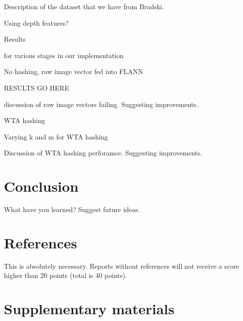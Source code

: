 \documentclass[10pt,twocolumn,letterpaper]{article}
\begin{document}
Description of the dataset that we have from Bradski. 

Using depth features?

Results

for various stages in our implementation

No hashing, raw image vector fed into FLANN

RESULTS GO HERE

discussion of raw image vectors failing. Suggesting improvements.

WTA hashing 

Varying k and m for WTA hashing

Discussion of WTA hashing perforamce. Suggesting improvements.

\section{Conclusion}

What have you learned? Suggest future ideas.

\section{References}

This is absolutely necessary. Reports without references will not receive a score higher than 20 points (total is 40 points).

\section{Supplementary materials}
\end{document}
